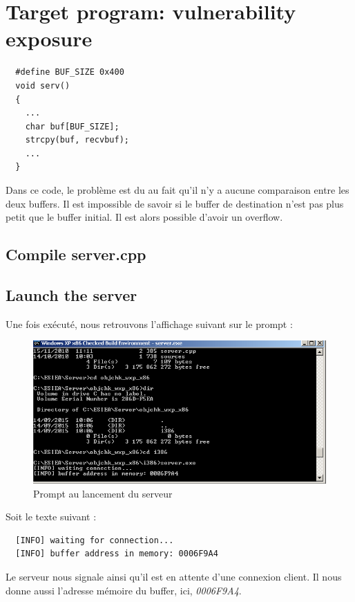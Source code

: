 \section{Target program: vulnerability exposure}

\begin{verbatim}
  #define BUF_SIZE 0x400
  void serv()
  {
    ...
    char buf[BUF_SIZE];
    strcpy(buf, recvbuf);
    ...
  }
\end{verbatim}

Dans ce code, le problème est du au fait qu'il n'y a aucune comparaison entre les deux buffers. Il est impossible de savoir si le buffer de destination n'est pas plus petit que le buffer initial. Il est alors possible d'avoir un overflow.\\

\subsection{Compile server.cpp}
\label{compile}


\subsection{Launch the server}

Une fois exécuté, nous retrouvons l'affichage suivant sur le prompt :

\begin{figure}[H]
 \centering
 \includegraphics[width=.9\textwidth]{img/prompt1.png}
 \caption{Prompt au lancement du serveur}
\end{figure}

Soit le texte suivant :
\begin{verbatim}
  [INFO] waiting for connection...
  [INFO] buffer address in memory: 0006F9A4
\end{verbatim}
Le serveur nous signale ainsi qu'il est en attente d'une connexion client. Il nous donne aussi l'adresse mémoire du buffer, ici, \textit{0006F9A4}.

